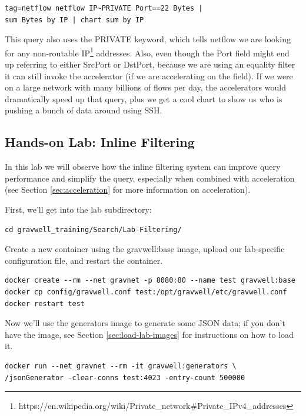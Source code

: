 \begin{Verbatim}[breaklines=true]
tag=netflow netflow IP~PRIVATE Port==22 Bytes |
sum Bytes by IP | chart sum by IP
\end{Verbatim}

This query also uses the PRIVATE keyword, which tells netflow we are
looking for any non-routable
IP\footnote{https://en.wikipedia.org/wiki/Private\_network\#Private\_IPv4\_addresses} addresses.
Also, even though the Port field might end up referring to either SrcPort or DstPort, because we are using an equality filter
it can still invoke the accelerator (if we are accelerating on the field).
If we were on a large network with many billions of flows per day, the
accelerators would dramatically speed up that query, plus we get a cool
chart to show us who is pushing a bunch of data around using SSH.

\clearpage
\subsection{Hands-on Lab: Inline Filtering}

In this lab we will observe how the inline
filtering system can improve query performance and simplify the query,
especially when combined with acceleration (see Section \ref{sec:acceleration} for more information
on acceleration).

First, we'll get into the lab subdirectory:

\begin{Verbatim}[breaklines=true]
cd gravwell_training/Search/Lab-Filtering/
\end{Verbatim}

Create a new container using the gravwell:base image, upload our lab-specific
configuration file, and restart the container.

\begin{Verbatim}[breaklines=true]
docker create --rm --net gravnet -p 8080:80 --name test gravwell:base
docker cp config/gravwell.conf test:/opt/gravwell/etc/gravwell.conf
docker restart test
\end{Verbatim}

Now we'll use the generators image to generate some JSON data; if you don't have the  image, see Section \ref{sec:load-lab-images} for instructions on how to load it.

\begin{Verbatim}[breaklines=true]
docker run --net gravnet --rm -it gravwell:generators \
/jsonGenerator -clear-conns test:4023 -entry-count 500000
\end{Verbatim}

